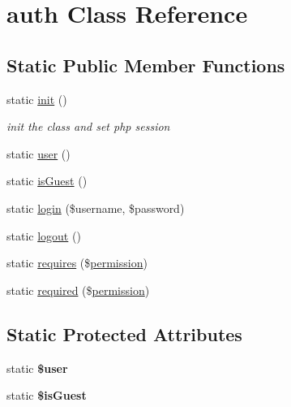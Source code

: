 \hypertarget{classcommon_1_1user_1_1legacy_1_1auth}{\section{auth \-Class \-Reference}
\label{classcommon_1_1user_1_1legacy_1_1auth}
}
\subsection*{\-Static \-Public \-Member \-Functions}
\begin{DoxyCompactItemize}
\item 
\hypertarget{classcommon_1_1user_1_1legacy_1_1auth_a9f0be6ae273d3669e11c29910a0be338}{static \hyperlink{classcommon_1_1user_1_1legacy_1_1auth_a9f0be6ae273d3669e11c29910a0be338}{init} ()}\label{classcommon_1_1user_1_1legacy_1_1auth_a9f0be6ae273d3669e11c29910a0be338}

\begin{DoxyCompactList}\small\item\em init the class and set php session \end{DoxyCompactList}\item 
static \hyperlink{classcommon_1_1user_1_1legacy_1_1auth_a7949f68385a98a60ff42ea3c3a768ec7}{user} ()
\item 
static \hyperlink{classcommon_1_1user_1_1legacy_1_1auth_a3d6c9ff1005fcc403d30d5dd8ef70210}{is\-Guest} ()
\item 
static \hyperlink{classcommon_1_1user_1_1legacy_1_1auth_aad19326559a5beda6d7cfc3e83fefd12}{login} (\$username, \$password)
\item 
static \hyperlink{classcommon_1_1user_1_1legacy_1_1auth_a1e34160e903835a43123f538e93457a2}{logout} ()
\item 
static \hyperlink{classcommon_1_1user_1_1legacy_1_1auth_a7a85e2ad55bb6f47464978a83f3a8924}{requires} (\$\hyperlink{classcommon_1_1user_1_1legacy_1_1permission}{permission})
\item 
static \hyperlink{classcommon_1_1user_1_1legacy_1_1auth_ae0ca697f3332a55efcbb374972946a99}{required} (\$\hyperlink{classcommon_1_1user_1_1legacy_1_1permission}{permission})
\end{DoxyCompactItemize}
\subsection*{\-Static \-Protected \-Attributes}
\begin{DoxyCompactItemize}
\item 
\hypertarget{classcommon_1_1user_1_1legacy_1_1auth_a598ca4e71b15a1313ec95f0df1027ca5}{static {\bfseries \$user}}\label{classcommon_1_1user_1_1legacy_1_1auth_a598ca4e71b15a1313ec95f0df1027ca5}

\item 
\hypertarget{classcommon_1_1user_1_1legacy_1_1auth_acd6f0a47fb21845165c3716723d50393}{static {\bfseries \$is\-Guest}}\label{classcommon_1_1user_1_1legacy_1_1auth_acd6f0a47fb21845165c3716723d50393}

\end{DoxyCompactItemize}


